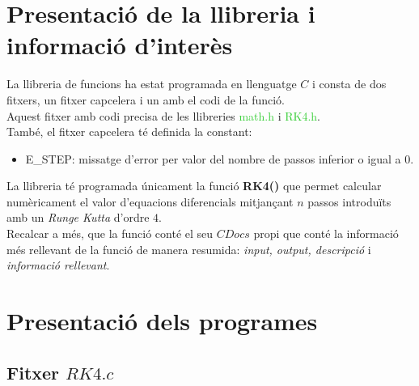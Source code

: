 \documentclass[a4paper, 11pt]{article}
\begin{document}
\section{Presentació de la llibreria i informació d'interès}
La llibreria de funcions ha estat programada en llenguatge $C$ i consta de dos fitxers, un fitxer capcelera i un amb el codi de la funció.\\
Aquest fitxer amb codi precisa de les llibreries \textcolor{LimeGreen}{math.h} i \textcolor{LimeGreen}{RK4.h}.\\ 
També, el fitxer capcelera té definida la constant:
\begin{itemize}\label{errorrk4}
    \item \textcolor{Dandelion}{E\_STEP}: missatge d'error per valor del nombre de passos inferior o igual a 0.
\end{itemize}
La llibreria té programada únicament la funció \textbf{\textcolor{funcblue}{RK4()}} que permet calcular numèricament el valor d'equacions diferencials mitjançant $n$ passos introduïts amb un \textit{Runge Kutta} d'ordre $4$.\\
Recalcar a més, que la funció conté el seu $CDocs$ propi que conté la informació més rellevant de la funció de manera resumida: \textit{input, output, descripció} i \textit{informació rellevant}.\\ 
\newpage
\section{Presentació dels programes}
\subsection{Fitxer $RK4.c$}
\end{document}
